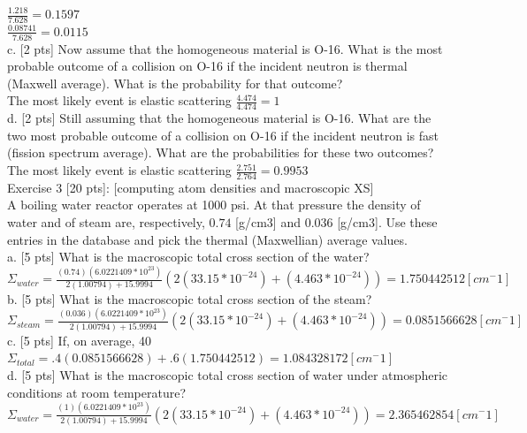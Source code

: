 \documentclass[12pt,fleqn, parskip=full]{scrartcl}
\begin{document}
$\frac{1.218}{7.628} = 0.1597$\\

$\frac{0.08741}{7.628} = 0.0115$\\

c. [2 pts] Now assume that the homogeneous material is O-16. What is the most probable outcome of a collision on O-16 if the incident neutron is thermal (Maxwell average). What is the probability for that
outcome?\\
The most likely  event is elastic scattering $\frac{4.474}{4.474} = 1$\\

d. [2 pts] Still assuming that the homogeneous material is O-16. What are the two most probable outcome of a collision on O-16 if the incident neutron is fast (fission spectrum average). What are the probabilities for these two outcomes?\\
The most likely  event is elastic scattering $\frac{2.751}{2.764} = 0.9953$\\

Exercise 3 [20 pts]: [computing atom densities and macroscopic XS]\\
A boiling water reactor operates at 1000 psi. At that pressure the density of water and of steam are, respectively, $0.74$ [g/cm3] and $0.036$ [g/cm3]. Use these entries in the database and pick the thermal (Maxwellian) average values.\\
a. [5 pts] What is the macroscopic total cross section of the water?\\
$\Sigma_{water} = \frac{(0.74)(6.0221409*10^{23})}{2(1.00794) + 15.9994}(2(33.15*10^{-24}) + (4.463*10^{-24})) = 1.750442512 [cm^-1]$\\

b. [5 pts] What is the macroscopic total cross section of the steam?\\
$\Sigma_{steam} = \frac{(0.036)(6.0221409*10^{23})}{2(1.00794) + 15.9994}(2(33.15*10^{-24}) + (4.463*10^{-24})) = 0.0851566628 [cm^-1]$\\

c. [5 pts] If, on average, 40%
$\Sigma_{total} = .4(0.0851566628) + .6(1.750442512) = 1.084328172 [cm^-1]$\\

d. [5 pts] What is the macroscopic total cross section of water under atmospheric conditions at room
temperature?\\
$\Sigma_{water} = \frac{(1)(6.0221409*10^{23})}{2(1.00794) + 15.9994}(2(33.15*10^{-24}) + (4.463*10^{-24})) = 2.365462854 [cm^-1]$\\
\end{document}
